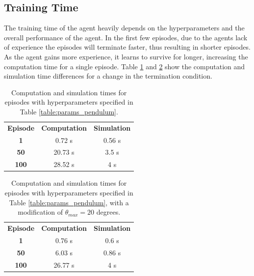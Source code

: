 \documentclass[final]{LTHtwocol} %
\begin{document}
\subsection{Training Time}
The training time of the agent heavily depends on the hyperparameters and the overall performance of the agent. 
In the first few episodes, due to the agents lack of experience the episodes will terminate faster, thus resulting in shorter episodes.
As the agent gains more experience, it learns to survive for longer, increasing the computation time for a single episode.
Table \ref{table:def_params_time} and \ref{table:other_params_time} show the computation and simulation time differences for a change in the termination condition.
\begin{table}[htp]
	\centering
	\begin{tabular}{|c|c|c|}
	\hline
	\rowcolor[HTML]{CBCEFB} 
	\multicolumn{3}{|c|}{\cellcolor[HTML]{CBCEFB}\textbf{Single Pendulum}} \\ \hline
	\rowcolor[HTML]{FFCCC9} 
	\textbf{Episode} & \textbf{Computation} & \textbf{Simulation} \\ \hline
	\rowcolor[HTML]{FFFFC7} 
	\textbf{1} & 0.72 s & 0.56 s\\ \hline
	\rowcolor[HTML]{FFFFC7} 
	\rowcolor[HTML]{FFFFC7} 
	\textbf{50} & 20.73 s & 3.5 s \\ \hline
	\rowcolor[HTML]{FFFFC7} 
	\rowcolor[HTML]{FFFFC7} 
	\textbf{100} & 28.52 s & 4 s\\ \hline
	\end{tabular}
	\caption{Computation and simulation times for episodes with hyperparameters specified in Table \ref{table:params_pendulum}.}
	\label{table:def_params_time}
\end{table}

\begin{table}[htp]
	\centering
	\begin{tabular}{|c|c|c|}
	\hline
	\rowcolor[HTML]{CBCEFB} 
	\multicolumn{3}{|c|}{\cellcolor[HTML]{CBCEFB}\textbf{Single Pendulum}} \\ \hline
	\rowcolor[HTML]{FFCCC9} 
	\textbf{Episode} & \textbf{Computation} & \textbf{Simulation} \\ \hline
	\rowcolor[HTML]{FFFFC7} 
	\textbf{1} & 0.76 s & 0.6 s \\ \hline
	\rowcolor[HTML]{FFFFC7} 
	\rowcolor[HTML]{FFFFC7} 
	\textbf{50} & 6.03 s & 0.86 s \\ \hline
	\rowcolor[HTML]{FFFFC7} 
	\rowcolor[HTML]{FFFFC7} 
	\textbf{100} & 26.77 s & 4 s\\ \hline
	\end{tabular}
	\caption{Computation and simulation times for episodes with hyperparameters specified in Table \ref{table:params_pendulum}, with a modification of $\theta_{max} = 20$ degrees.}
	\label{table:other_params_time}
\end{table}
\end{document}

